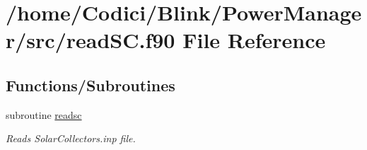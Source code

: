 \hypertarget{read_s_c_8f90}{\section{/home/\-Codici/\-Blink/\-Power\-Manager/src/read\-S\-C.f90 File Reference}
\label{read_s_c_8f90}
}
\subsection*{Functions/\-Subroutines}
\begin{DoxyCompactItemize}
\item 
subroutine \hyperlink{read_s_c_8f90_ac61b0f9600e1b2020b151202682c41f4}{readsc}
\begin{DoxyCompactList}\small\item\em Reads Solar\-Collectors.\-inp file. \end{DoxyCompactList}\end{DoxyCompactItemize}


